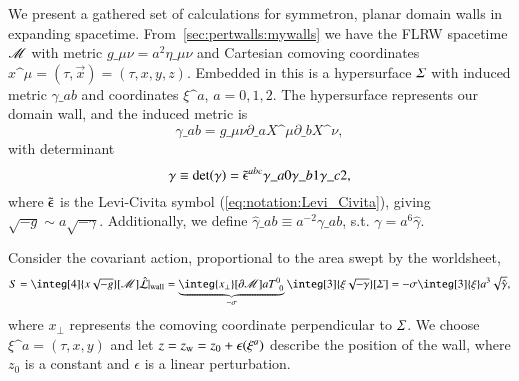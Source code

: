 





\newcommand\hypsurf{\ALIAShypsurf}
\newcommand\pert{\ALIASpert}
\newcommand\sppt{\ALIASsppt}







We present a gathered set of calculations for symmetron, planar domain walls in expanding spacetime. From~\cref{sec:pertwalls:mywalls} we have the FLRW spacetime $\mathscr{M}$ with metric $g\_{\mu\nu}=a^2 \eta\_{\mu\nu}$ and Cartesian comoving coordinates $x\^\mu = (\tau, \vec{x})=(\tau, x,y,z)$. Embedded in this is a hypersurface $\hypsurf$ with induced metric $\gamma\_{ab}$ and coordinates $\xi\^a$, $a=0,1,2$. %
The hypersurface represents our domain wall, and the induced metric is
\begin{equation}
    \gamma\_{ab} = g\_{\mu\nu} \partial\_{a} X\^\mu \partial\_{b} X\^\nu,
\end{equation}
with determinant
\begin{equation}
    \gamma \equiv \det(\gamma) = \tilde{\epsilonup}\^{abc}\gamma\_{a0}\gamma\_{b1}\gamma\_{c2},
\end{equation}
where $\tilde{\epsilonup}$ is the Levi-Civita symbol (\cref{eq:notation:Levi_Civita}), 
giving $\sqrt{-g}\sim a\sqrt{-\gamma}$. Additionally, we define $\hat{\gamma}\_{ab} \equiv a^{-2}\gamma\_{ab}$, s.t. $\gamma =a^6 \hat{\gamma}$.


Consider the covariant action, proportional to the area swept by the worldsheet,
\begin{equation}\label{eq:walls:covariant_action}
    S = \integ[4]{x\sqrt{-g}}[\Manifold] \hat{\mathcal{L}}\rvert\ped{wall} = \underbrace{\integ{x_\bot}[\partial \Manifold] aT\iud{0}{0}}_{-\sigma} \integ[3]{\xi \sqrt{-\gamma}}[\hypsurf] = -\sigma \integ[3]{\xi}a^3 \sqrt{\hat{\gamma}},
\end{equation}
where $x_\bot$ represents the comoving coordinate perpendicular to $\hypsurf$. %
We choose $\xi\^a = (\tau, x, y)$ and let $z=z\ped{w}=z_0 + \epsilon(\xi\^a)$ describe the position of the wall, where $z_0$ is a constant and $\epsilon$ is a linear perturbation. 

